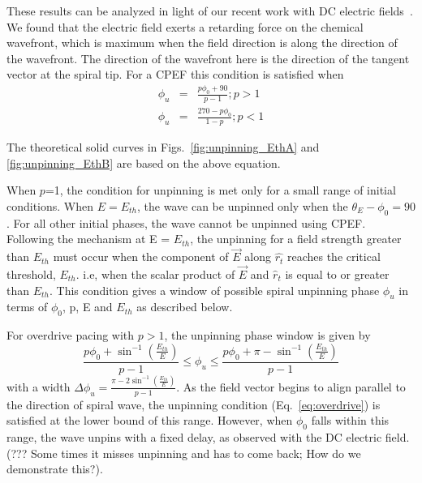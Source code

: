 These results can be analyzed in light of our recent work with DC
electric fields~\cite{Amrutha}. We found that the electric field exerts a
retarding force on the chemical wavefront, which is maximum when the
field direction is along the direction of the wavefront. The direction of the
wavefront here is the direction of the tangent vector at the spiral tip. For a
CPEF this condition is satisfied when 
\begin{eqnarray}
	\phi_u &=& \frac{p \phi_0+ 90}{p-1} ; p>1 \\
	\phi_u &=& \frac{270-p \phi_0}{1-p} ; p<1  
\label{eq:Eth}
\end{eqnarray}

The theoretical solid curves in Figs.~\ref{fig:unpinning_EthA} and
\ref{fig:unpinning_EthB} are based on the above equation.   

When $p$=1, the condition for unpinning is met only for a small range of initial
conditions. When $E=E_{th}$, the wave can be unpinned only when the
$\theta_E-\phi_0 = 90$. For all other initial phases, the wave cannot be unpinned using CPEF.  
Following the mechanism at E = $E_{th}$, the unpinning for a field strength
greater than $E_{th}$ must occur when the component of $\vec{E}$ along
$\hat{r_t}$ reaches the critical threshold, $E_{th}$. i.e, when the scalar
product of ${\vec{E}}$ and ${\hat{r}}_{t}$ is equal to or greater than
$E_{th}$. This condition gives a window of possible spiral unpinning phase
$\phi_{u}$ in terms of $\phi_{0}$, p, E and $E_{th}$ as described below.

For overdrive pacing with $p>1$, the unpinning phase window is given by
\begin{equation}
\frac{p \phi_0+ {\sin^{-1}}(\frac{E_{th}}{E})}{p-1}   \leq \phi_u \leq \frac{p \phi_0+\pi -{\sin^{-1}}(\frac{E_{th}}{E})}{p-1}
\label{eq:overdrive}
\end{equation}
with a width $\Delta\phi_u = \frac{\pi - 2 \sin^{-1}(\frac{E_{th}}{E})}{p-1}$.
As the field vector begins to align parallel to the direction of spiral wave,
the unpinning condition (Eq.~\ref{eq:overdrive}) is satisfied at the lower
bound of this range. However, when $\phi_0$ falls within this range, the wave
unpins with a fixed delay, as observed with the DC electric field. (??? Some times it misses unpinning and has to come back; How do we demonstrate this?).


